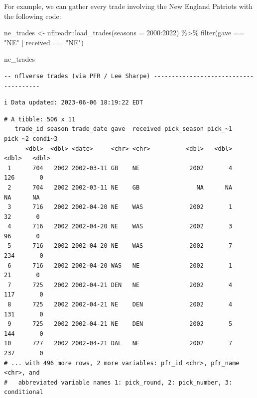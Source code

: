 \documentclass[
  letterpaper,
]{krantz}
\newenvironment{Shaded}{\begin{snugshade}}{\end{snugshade}}
\newcommand{\AttributeTok}[1]{\textcolor[rgb]{0.40,0.45,0.13}{#1}}
\newcommand{\DecValTok}[1]{\textcolor[rgb]{0.68,0.00,0.00}{#1}}
\newcommand{\FunctionTok}[1]{\textcolor[rgb]{0.28,0.35,0.67}{#1}}
\newcommand{\NormalTok}[1]{\textcolor[rgb]{0.00,0.23,0.31}{#1}}
\newcommand{\OtherTok}[1]{\textcolor[rgb]{0.00,0.23,0.31}{#1}}
\newcommand{\SpecialCharTok}[1]{\textcolor[rgb]{0.37,0.37,0.37}{#1}}
\newcommand{\StringTok}[1]{\textcolor[rgb]{0.13,0.47,0.30}{#1}}
\begin{document}
For example, we can gather every trade involving the New England
Patriots with the following code:

\begin{Shaded}
\begin{Highlighting}[]
\NormalTok{ne\_trades }\OtherTok{\textless{}{-}}\NormalTok{ nflreadr}\SpecialCharTok{::}\FunctionTok{load\_trades}\NormalTok{(}\AttributeTok{seasons =} \DecValTok{2000}\SpecialCharTok{:}\DecValTok{2022}\NormalTok{) }\SpecialCharTok{\%\textgreater{}\%}
  \FunctionTok{filter}\NormalTok{(gave }\SpecialCharTok{==} \StringTok{"NE"} \SpecialCharTok{|}\NormalTok{ received }\SpecialCharTok{==} \StringTok{"NE"}\NormalTok{)}

\NormalTok{ne\_trades}
\end{Highlighting}
\end{Shaded}

\begin{verbatim}
-- nflverse trades (via PFR / Lee Sharpe) --------------------------------------
\end{verbatim}

\begin{verbatim}
i Data updated: 2023-06-06 18:19:22 EDT
\end{verbatim}

\begin{verbatim}
# A tibble: 506 x 11
   trade_id season trade_date gave  received pick_season pick_~1 pick_~2 condi~3
      <dbl>  <dbl> <date>     <chr> <chr>          <dbl>   <dbl>   <dbl>   <dbl>
 1      704   2002 2002-03-11 GB    NE              2002       4     126       0
 2      704   2002 2002-03-11 NE    GB                NA      NA      NA      NA
 3      716   2002 2002-04-20 NE    WAS             2002       1      32       0
 4      716   2002 2002-04-20 NE    WAS             2002       3      96       0
 5      716   2002 2002-04-20 NE    WAS             2002       7     234       0
 6      716   2002 2002-04-20 WAS   NE              2002       1      21       0
 7      725   2002 2002-04-21 DEN   NE              2002       4     117       0
 8      725   2002 2002-04-21 NE    DEN             2002       4     131       0
 9      725   2002 2002-04-21 NE    DEN             2002       5     144       0
10      727   2002 2002-04-21 DAL   NE              2002       7     237       0
# ... with 496 more rows, 2 more variables: pfr_id <chr>, pfr_name <chr>, and
#   abbreviated variable names 1: pick_round, 2: pick_number, 3: conditional
\end{verbatim}
\end{document}
